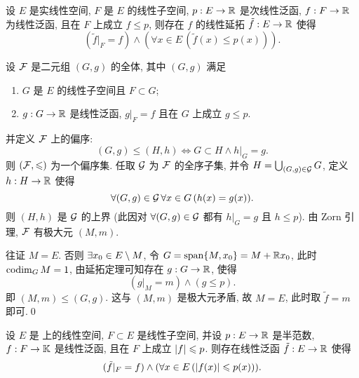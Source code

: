 	\begin{Theorem}
		设 $ E $ 是实线性空间, $ F $ 是 $ E $ 的线性子空间, $ p: E\to\mathbb{R} $ 是次线性泛函, $ f : F\to\mathbb{R} $ 为线性泛函, 且在 $ F $ 上成立 $ f\leqslant p $, 则存在 $ f $ 的线性延拓 $ \tilde{f}:E\to\mathbb{R} $ 使得
		\[
			(\tilde{f}|_{F}=f)\land(\forall x\in E\,(\tilde{f}(x)\leqslant p(x))).
		\]
	\end{Theorem}
	\begin{Proof}
		设 $ \mathcal{F} $ 是二元组 $ (G, g) $ 的全体, 其中 $ (G, g) $ 满足
		\begin{enumerate}[(1)]
			\item $ G $ 是 $ E $ 的线性子空间且 $ F\subset G $;
			\item $ g:G\to \mathbb{R} $ 是线性泛函, $ g|_{F}=f $ 且在 $ G $ 上成立 $ g\leqslant p $.
		\end{enumerate}
		并定义 $ \mathcal{F} $ 上的偏序:
		\[
			(G, g)\leqslant (H, h)\Longleftrightarrow G\subset H \land h|_{G}=g.
		\]
		则 $ (\mathcal{F}, \leqslant) $ 为一个偏序集. 任取 $ \mathcal{G} $ 为 $ \mathcal{F} $ 的全序子集, 并令 $ H = \bigcup_{(G, g)\in\mathcal{G}}G $, 定义 $ h:H\to\mathbb{R} $ 使得
		\[
			\forall (G, g)\in\mathcal{G}\,\forall x\in G\,(h(x)=g(x)).
		\]
		则 $ (H, h) $ 是 $ \mathcal{G} $ 的上界 (此因对 $ \forall (G, g)\in\mathcal{G} $ 都有 $ h|_{G}=g $ 且 $ h\leqslant p $). 由 Zorn 引理, $ \mathcal{F} $ 有极大元 $ (M, m) $.

		往证 $ M=E $. 否则 $ \exists x_{0}\in E\setminus M $, 令 $ G = \operatorname{span}\{ M, x_{0} \}=M+\mathbb{R} x_{0} $, 此时 $ \operatorname{codim}_{G}M=1 $, 由延拓定理可知存在 $ g:G\to\mathbb{R} $, 使得
		\[
			(g|_{M} = m) \land (g\leqslant p).
		\]
		即 $ (M, m)\leqslant(G, g) $. 这与 $ (M, m) $ 是极大元矛盾, 故 $ M = E $, 此时取 $ \tilde{f}=m $ 即可.\qed
	\end{Proof}
	\begin{Theorem}
		设 $ E $ 是 \K 上的线性空间,  $ F\subset E $ 是线性子空间, 并设 $ p:E\to\mathbb{R} $ 是半范数,  $ f:F\to\mathbb{K} $ 是线性泛函, 且在 $ F $ 上成立 $ \left| f \right| \leqslant p $. 则存在线性泛函 $ \tilde{f}:E\to\mathbb{R} $ 使得
		\[
			(\tilde{f}|_{F}=f)\land(\forall x\in E\,(\left| f(x) \right| \leqslant p(x))).
		\]
	\end{Theorem}
